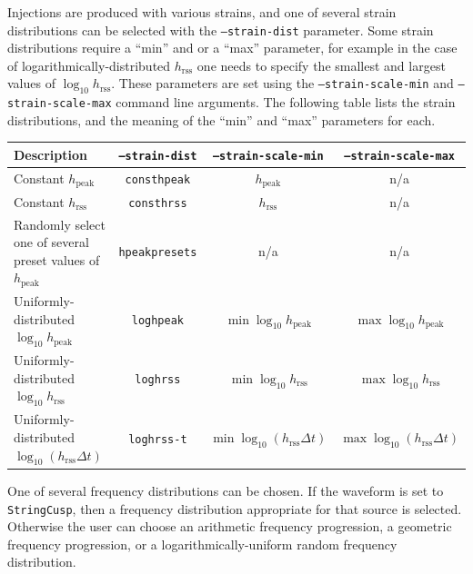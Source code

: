 \documentclass{article}
\newcommand{\option}[1]{\texttt{#1}}
\newenvironment{entry}%
  {\begin{list}{}{\renewcommand{\makelabel}[1]%
    {\parbox[b]{\labelwidth}{\makebox[0pt][l]{\textbf{##1}}\\}}%
    \setlength{\labelwidth}{1em}%
    \setlength{\labelsep}{1em}%
    \setlength{\leftmargin}{2em}%
    \setlength{\topsep}{\medskipamount}%
    \setlength{\itemsep}{\medskipamount}%
    \setlength{\parsep}{\medskipamount}%
    \setlength{\listparindent}{0pt}}}
  {\end{list}}
\begin{document}
\begin{entry}
Injections are produced with various strains, and one of several strain
distributions can be selected with the \option{--strain-dist} parameter.
Some strain distributions require a ``min'' and or a ``max'' parameter, for
example in the case of logarithmically-distributed \(h_{\mathrm{rss}}\) one
needs to specify the smallest and largest values of \(\log_{10}
h_{\mathrm{rss}}\).  These parameters are set using the
\option{--strain-scale-min} and \option{--strain-scale-max} command line
arguments.  The following table lists the strain distributions, and the
meaning of the ``min'' and ``max'' parameters for each.
\begin{center}\begin{tabular}{p{3cm}ccc}
\hline\hline
Description & \option{--strain-dist} & \option{--strain-scale-min} &
\option{--strain-scale-max} \\
\hline
Constant \(h_{\mathrm{peak}}\) & \texttt{consthpeak} & \(h_{\mathrm{peak}}\) & n/a \\
Constant \(h_{\mathrm{rss}}\) & \texttt{consthrss} & \(h_{\mathrm{rss}}\) & n/a \\
Randomly select one of several preset values of \(h_{\mathrm{peak}}\) & \texttt{hpeakpresets} & n/a & n/a \\
Uniformly-distributed \(\log_{10} h_{\mathrm{peak}}\) & \texttt{loghpeak} & \(\min \log_{10} h_{\mathrm{peak}}\) & \(\max \log_{10} h_{\mathrm{peak}}\) \\
Uniformly-distributed \(\log_{10} h_{\mathrm{rss}}\) & \texttt{loghrss} & \(\min \log_{10} h_{\mathrm{rss}}\) & \(\max \log_{10} h_{\mathrm{rss}}\) \\
Uniformly-distributed \(\log_{10} (h_{\mathrm{rss}} \Delta t)\) & \texttt{loghrss-t} & \(\min \log_{10} (h_{\mathrm{rss}} \Delta t)\) & \(\max \log_{10} (h_{\mathrm{rss}} \Delta t)\) \\
\hline\hline
\end{tabular}\end{center}

One of several frequency distributions can be chosen.  If the waveform is
set to \texttt{StringCusp}, then a frequency distribution appropriate for
that source is selected.  Otherwise the user can choose an arithmetic
frequency progression, a geometric frequency progression, or a
logarithmically-uniform random frequency distribution.


\end{entry}
\end{document}
